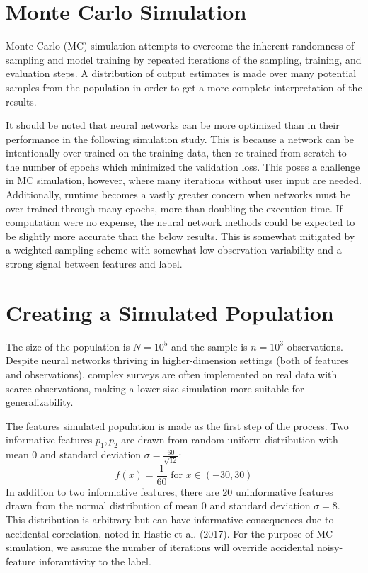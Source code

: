 \documentclass[12pt,twoside]{reedthesis}
\begin{document}
\section{Monte Carlo Simulation}\label{monte-carlo-simulation}

Monte Carlo (MC) simulation attempts to overcome the inherent randomness
of sampling and model training by repeated iterations of the sampling,
training, and evaluation steps. A distribution of output estimates is
made over many potential samples from the population in order to get a
more complete interpretation of the results.

It should be noted that neural networks can be more optimized than in
their performance in the following simulation study. This is because a
network can be intentionally over-trained on the training data, then
re-trained from scratch to the number of epochs which minimized the
validation loss. This poses a challenge in MC simulation, however, where
many iterations without user input are needed. Additionally, runtime
becomes a vastly greater concern when networks must be over-trained
through many epochs, more than doubling the execution time. If
computation were no expense, the neural network methods could be
expected to be slightly more accurate than the below results. This is
somewhat mitigated by a weighted sampling scheme with somewhat low
observation variability and a strong signal between features and label.

\section{Creating a Simulated
Population}\label{creating-a-simulated-population}

The size of the population is \(N=10^5\) and the sample is \(n=10^3\)
observations. Despite neural networks thriving in higher-dimension
settings (both of features and observations), complex surveys are often
implemented on real data with scarce observations, making a lower-size
simulation more suitable for generalizability.

The features simulated population is made as the first step of the
process. Two informative features \(p_1, p_2\) are drawn from random
uniform distribution with mean \(0\) and standard deviation
\(\sigma = \frac{60}{\sqrt{12}}\): \[
f(x) = \frac{1}{60} \text{ for } x \in (-30, 30)
\] In addition to two informative features, there are \(20\)
uninformative features drawn from the normal distribution of mean \(0\)
and standard deviation \(\sigma = 8\). This distribution is arbitrary
but can have informative consequences due to accidental correlation,
noted in Hastie et al. (2017). For the purpose of MC simulation, we
assume the number of iterations will override accidental noisy-feature
inforamtivity to the label.
\end{document}
